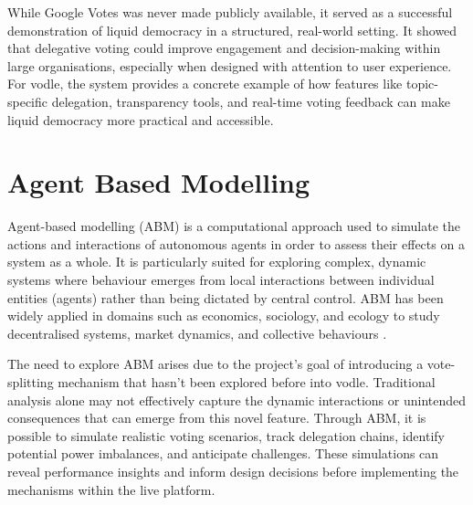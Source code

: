 While Google Votes was never made publicly available, it served as a successful demonstration of liquid democracy in a structured, real-world setting. It showed that delegative voting could improve engagement and decision-making within large organisations, especially when designed with attention to user experience. For vodle, the system provides a concrete example of how features like topic-specific delegation, transparency tools, and real-time voting feedback can make liquid democracy more practical and accessible.
\section{Agent Based Modelling}
Agent-based modelling (ABM) is a computational approach used to simulate the actions and interactions of autonomous agents in order to assess their effects on a system as a whole. It is particularly suited for exploring complex, dynamic systems where behaviour emerges from local interactions between individual entities (agents) rather than being dictated by central control. ABM has been widely applied in domains such as economics, sociology, and ecology to study decentralised systems, market dynamics, and collective behaviours \citep{bonabeau2002agent}.

The need to explore ABM arises due to the project's goal of introducing a vote-splitting mechanism that hasn't been explored before into vodle. Traditional analysis alone may not effectively capture the dynamic interactions or unintended consequences that can emerge from this novel feature. Through ABM, it is possible to simulate realistic voting scenarios, track delegation chains, identify potential power imbalances, and anticipate challenges. These simulations can reveal performance insights and inform design decisions before implementing the mechanisms within the live platform.

